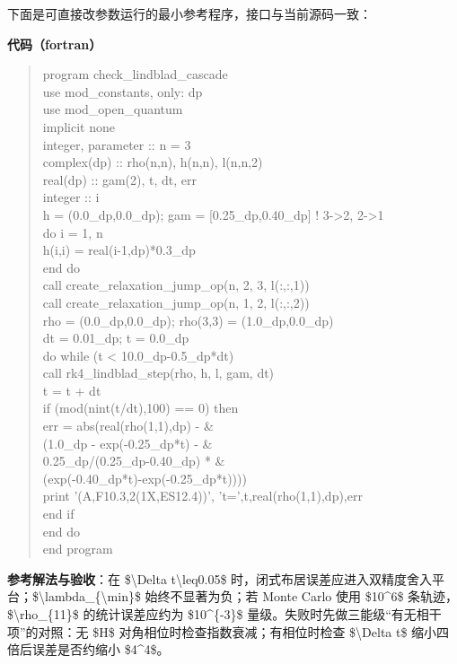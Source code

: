 \documentclass[UTF8,openany,11pt,fontset=fandol]{ctexbook}
\begin{document}
下面是可直接改参数运行的最小参考程序，接口与当前源码一致：

\textbf{代码（fortran）}

\begin{quote}
program check\_lindblad\_cascade\\
use mod\_constants, only: dp\\
use mod\_open\_quantum\\
implicit none\\
integer, parameter :: n = 3\\
complex(dp) :: rho(n,n), h(n,n), l(n,n,2)\\
real(dp) :: gam(2), t, dt, err\\
integer :: i\\
h = (0.0\_dp,0.0\_dp); gam = {[}0.25\_dp,0.40\_dp{]} ! 3-\textgreater2,
2-\textgreater1\\
do i = 1, n\\
h(i,i) = real(i-1,dp)*0.3\_dp\\
end do\\
call create\_relaxation\_jump\_op(n, 2, 3, l(:,:,1))\\
call create\_relaxation\_jump\_op(n, 1, 2, l(:,:,2))\\
rho = (0.0\_dp,0.0\_dp); rho(3,3) = (1.0\_dp,0.0\_dp)\\
dt = 0.01\_dp; t = 0.0\_dp\\
do while (t \textless{} 10.0\_dp-0.5\_dp*dt)\\
call rk4\_lindblad\_step(rho, h, l, gam, dt)\\
t = t + dt\\
if (mod(nint(t/dt),100) == 0) then\\
err = abs(real(rho(1,1),dp) - \&\\
(1.0\_dp - exp(-0.25\_dp*t) - \&\\
0.25\_dp/(0.25\_dp-0.40\_dp) * \&\\
(exp(-0.40\_dp*t)-exp(-0.25\_dp*t))))\\
print '(A,F10.3,2(1X,ES12.4))', 't=',t,real(rho(1,1),dp),err\\
end if\\
end do\\
end program
\end{quote}

\textbf{参考解法与验收}：在 \$\textbackslash Delta
t\textbackslash leq0.05\$
时，闭式布居误差应进入双精度舍入平台；\$\textbackslash lambda\_\{\textbackslash min\}\$
始终不显著为负；若 Monte Carlo 使用 \$10\^{}6\$
条轨迹，\$\textbackslash rho\_\{11\}\$ 的统计误差应约为 \$10\^{}\{-3\}\$
量级。失败时先做三能级``有无相干项''的对照：无 \$H\$
对角相位时检查指数衰减；有相位时检查 \$\textbackslash Delta t\$
缩小四倍后误差是否约缩小 \$4\^{}4\$。
\end{document}
